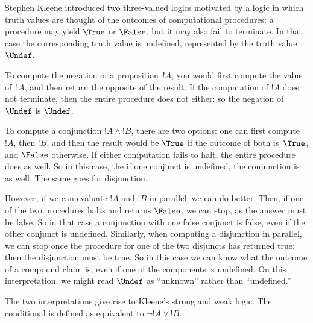 \documentclass[../../../include/open-logic-section]{subfiles}
\begin{document}

Stephen Kleene introduced two three-valued logics motivated by a logic
in which truth values are thought of the outcomes of computational
procedures: a procedure may yield $\True$ or $\False$, but it may also
fail to terminate.  In that case the corresponding truth value is
undefined, represented by the truth value~$\Undef$.

To compute the negation of a proposition~$!A$, you would first compute
the value of~$!A$, and then return the opposite of the result.  If the
computation of $!A$ does not terminate, then the entire procedure does
not either: so the negation of $\Undef$ is $\Undef$.

To compute a conjunction $!A \land !B$, there are two options: one can
first compute~$!A$, then $!B$, and then the result would be $\True$ if
the outcome of both is~$\True$, and $\False$ otherwise.  If either
computation fails to halt, the entire procedure does as well. So in
this case, the if one conjunct is undefined, the conjunction is as
well.  The same goes for disjunction.

However, if we can evaluate $!A$ and $!B$ in parallel, we can do better.
Then, if one of the two procedures halts and returns $\False$, we can
stop, as the answer must be false.  So in that case a conjunction with
one false conjunct is false, even if the other conjunct is undefined.
Similarly, when computing a disjunction in parallel, we can stop once
the procedure for one of the two disjuncts has returned true: then the
disjunction must be true. So in this case we can know what the outcome
of a compound claim is, even if one of the components is undefined. On
this interpretation, we might read $\Undef$ as ``unknown'' rather than
``undefined.''

The two interpretations give rise to Kleene's strong and weak logic.
The conditional is defined as equivalent to $\lnot !A \lor !B$.
\end{document}

